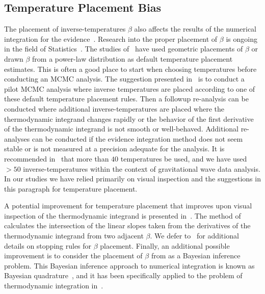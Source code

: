 \subsection{Temperature Placement Bias}
The placement of inverse-temperatures $\beta$ also affects the results of the numerical integration for the evidence~\citep{lartillot2006computing, xie2010improving}. Research into the proper placement of $\beta$ is ongoing in the field of Statistics~\citep{calderhead2009estimating, annis2019thermodynamic}. The studies of~\cite{friel2008marginal, xie2010improving, Russel:2018pqv} have used geometric placements of $\beta$ or drawn $\beta$ from a power-law distribution as default temperature placement estimates. This is often a good place to start when choosing temperatures before conducting an MCMC analysis. The suggestion presented in~\cite{liu2016evaluating, de2013comparison, annis2019thermodynamic} is to conduct a pilot MCMC analysis where inverse temperatures are placed according to one of these default temperature placement rules. Then a followup re-analysis can be conducted where additional inverse-temperatures are placed where the thermodynamic integrand changes rapidly or the behavior of the first derivative of the thermodynamic integrand is not smooth or well-behaved. Additional re-analyses can be conducted if the evidence integration method does not seem stable or is not measured at a precision adequate for the analysis. It is recommended in~\cite{annis2019thermodynamic} that more than $40$ temperatures be used, and we have used $>50$ inverse-temperatures within the context of gravitational wave data analysis. In our studies we have relied primarily on visual inspection and the suggestions in this paragraph for temperature placement.

A potential improvement for temperature placement that improves upon visual inspection of the thermodynamic integrand is presented in~\cite{friel2014improving}. The method of ~\cite{friel2014improving} calculates the intersection of the linear slopes taken from the derivatives of the thermodynamic integrand from two adjacent $\beta$. We defer to~\cite{friel2014improving} for additional details on stopping rules for $\beta$ placement. Finally, an additional possible improvement is to consider the placement of $\beta$ from as a Bayesian inference problem. This Bayesian inference approach to numerical integration is known as Bayesian quadrature~\cite{diaconis1988bayesian}, and it has been specifically applied to the problem of thermodynamic integration in~\cite{briol2015probabilistic}.

